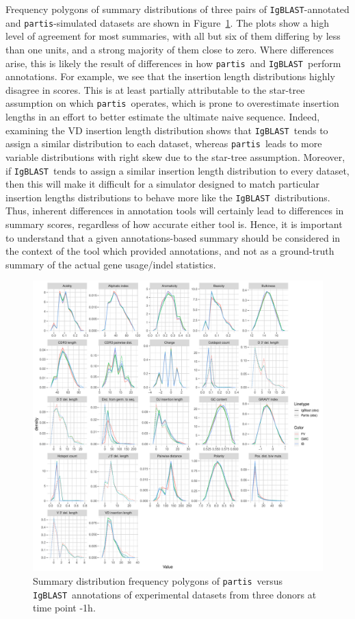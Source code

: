 \documentclass{article}
\newcommand{\partis}{\texttt{partis}}
\newcommand{\igblast}{\texttt{IgBLAST}}
\begin{document}
Frequency polygons of summary distributions of three pairs of \igblast-annotated and \partis-simulated datasets are shown in Figure~\ref{fig:PartisIgBlastFreqpolys}.
The plots show a high level of agreement for most summaries, with all but six of them differing by less than one units, and a strong majority of them close to zero.
Where differences arise, this is likely the result of differences in how \partis\ and \igblast\ perform annotations.
For example, we see that the insertion length distributions highly disagree in scores.
This is at least partially attributable to the star-tree assumption on which \partis\ operates, which is prone to overestimate insertion lengths in an effort to better estimate the ultimate naive sequence.
Indeed, examining the VD insertion length distribution shows that \igblast\ tends to assign a similar distribution to each dataset, whereas \partis\ leads to more variable distributions with right skew due to the star-tree assumption.
Moreover, if \igblast\ tends to assign a similar insertion length distribution to every dataset, then this will make it difficult for a simulator designed to match particular insertion lengths distributions to behave more like the \igblast\ distributions.
Thus, inherent differences in annotation tools will certainly lead to differences in summary scores, regardless of how accurate either tool is.
Hence, it is important to understand that a given annotations-based summary should be considered in the context of the tool which provided annotations, and not as a ground-truth summary of the actual gene usage/indel statistics.

\begin{figure}
    \includegraphics[width=\linewidth]{Figures/PartisScores/pi_freqpoly.pdf}
    \caption{Summary distribution frequency polygons of \partis\ versus \igblast\ annotations of experimental datasets from three donors at time point -1h.}
    \label{fig:PartisIgBlastFreqpolys}
\end{figure}
\end{document}
